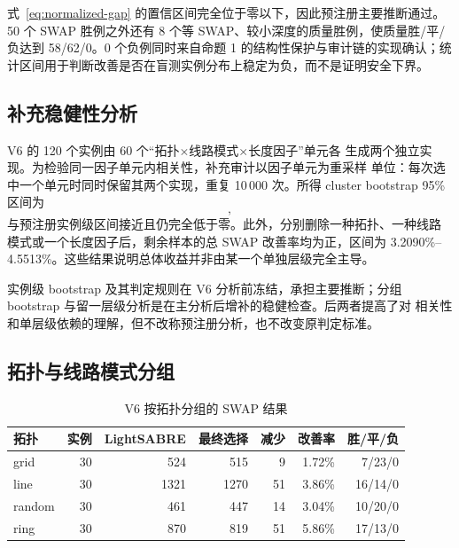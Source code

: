 \documentclass[11pt,a4paper]{article}
\begin{document}
式~\eqref{eq:normalized-gap} 的置信区间完全位于零以下，因此预注册主要推断通过。50 个 SWAP 胜例之外还有 8 个等 SWAP、较小深度的质量胜例，使质量胜/平/负达到 58/62/0。0 个负例同时来自命题 1 的结构性保护与审计链的实现确认；统计区间用于判断改善是否在盲测实例分布上稳定为负，而不是证明安全下界。

\subsection{补充稳健性分析}

V6 的 120 个实例由 60 个“拓扑$\times$线路模式$\times$长度因子”单元各
生成两个独立实现。为检验同一因子单元内相关性，补充审计以因子单元为重采样
单位：每次选中一个单元时同时保留其两个实现，重复 10\,000 次。所得
cluster bootstrap 95\% 区间为
\begin{equation}
  [-0.024392,-0.013594],
\end{equation}
与预注册实例级区间接近且仍完全低于零。此外，分别删除一种拓扑、一种线路
模式或一个长度因子后，剩余样本的总 SWAP 改善率均为正，区间为
3.2090\%--4.5513\%。这些结果说明总体收益并非由某一个单独层级完全主导。

\begin{notebox}[title={预注册与补充分析的区分}]
实例级 bootstrap 及其判定规则在 V6 分析前冻结，承担主要推断；分组
bootstrap 与留一层级分析是在主分析后增补的稳健检查。后两者提高了对
相关性和单层级依赖的理解，但不改称预注册分析，也不改变原判定标准。
\end{notebox}

\subsection{拓扑与线路模式分组}

\begin{table}[H]
\centering
\small
\caption{V6 按拓扑分组的 SWAP 结果}
\label{tab:topology}
\begin{tabular}{lrrrrrr}
\toprule
拓扑 & 实例 & LightSABRE & 最终选择 & 减少 & 改善率 & 胜/平/负 \\
\midrule
grid   & 30 & 524  & 515  & 9  & 1.72\% & 7/23/0 \\
line   & 30 & 1321 & 1270 & 51 & 3.86\% & 16/14/0 \\
random & 30 & 461  & 447  & 14 & 3.04\% & 10/20/0 \\
ring   & 30 & 870  & 819  & 51 & 5.86\% & 17/13/0 \\
\bottomrule
\end{tabular}
\end{table}
\end{document}
